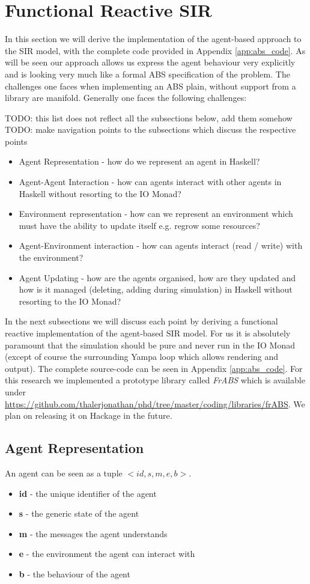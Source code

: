 \section{Functional Reactive SIR}
In this section we will derive the implementation of the agent-based approach to the SIR model, with the complete code provided in Appendix \ref{app:abs_code}. As will be seen our approach allows us express the agent behaviour very explicitly and is looking very much like a formal ABS specification of the problem. The challenges one faces when implementing an ABS plain, without support from a library are manifold. Generally one faces the following challenges:

TODO: this list does not reflect all the subsections below, add them somehow
TODO: make navigation points to the subsections which discuss the respective points

\begin{itemize}
	\item Agent Representation - how do we represent an agent in Haskell?
	\item Agent-Agent Interaction - how can agents interact with other agents in Haskell without resorting to the IO Monad?
	\item Environment representation - how can we represent an environment which must have the ability to update itself e.g. regrow some resources?
	\item Agent-Environment interaction - how can agents interact (read / write) with the environment?
	\item Agent Updating - how are the agents organised, how are they updated and how is it managed (deleting, adding during simulation) in Haskell without resorting to the IO Monad?
\end{itemize}

In the next subsections we will discuss each point by deriving a functional reactive implementation of the agent-based SIR model. For us it is absolutely paramount that the simulation should be pure and never run in the IO Monad (except of course the surrounding Yampa loop which allows rendering and output). The complete source-code can be seen in Appendix \ref{app:abs_code}. For this research we implemented a prototype library called \textit{FrABS} which is available under \url{https://github.com/thalerjonathan/phd/tree/master/coding/libraries/frABS}. We plan on releasing it on Hackage in the future.

\subsection{Agent Representation}
An agent can be seen as a tuple $<id, s, m, e, b>$.
\begin{itemize}
	\item \textbf{id} - the unique identifier of the agent
	\item \textbf{s} - the generic state of the agent
	\item \textbf{m} - the messages the agent understands
	\item \textbf{e} - the environment the agent can interact with
	\item \textbf{b} - the behaviour of the agent
\end{itemize}

